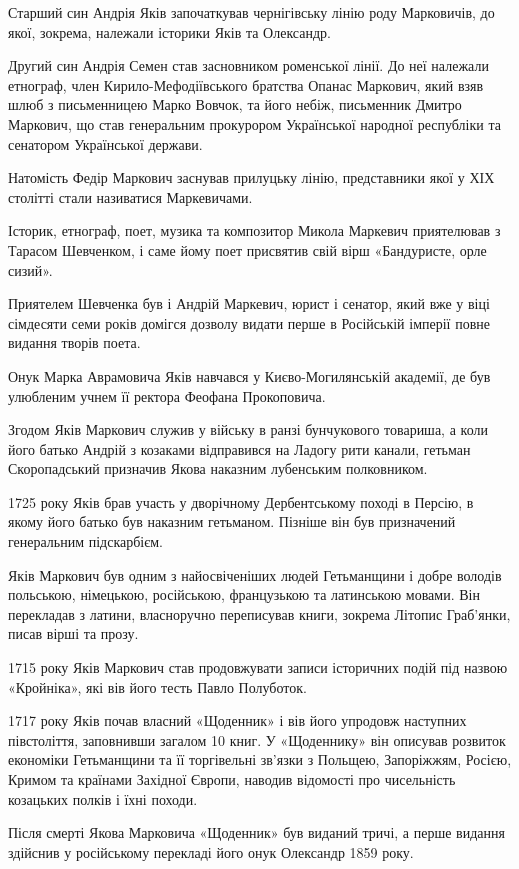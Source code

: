 Старший син Андрія Яків започаткував чернігівську лінію роду Марковичів, до
якої, зокрема, належали історики Яків та Олександр.

Другий син Андрія Семен став засновником роменської лінії. До неї належали
етнограф, член Кирило-Мефодіївського братства Опанас Маркович, який взяв шлюб з
письменницею Марко Вовчок, та його небіж, письменник Дмитро Маркович, що став
генеральним прокурором Української народної республіки та сенатором Української
держави.

Натомість Федір Маркович заснував прилуцьку лінію, представники якої у ХІХ
столітті стали називатися Маркевичами.

Історик, етнограф, поет, музика та композитор Микола Маркевич приятелював з
Тарасом Шевченком, і саме йому поет присвятив свій вірш «Бандуристе, орле
сизий».

Приятелем Шевченка був і Андрій Маркевич, юрист і сенатор, який вже у віці
сімдесяти семи років домігся дозволу видати перше в Російській імперії повне
видання творів поета.

Онук Марка Аврамовича Яків навчався у Києво-Могилянській академії, де був улюбленим учнем її ректора Феофана Прокоповича.

Згодом Яків Маркович служив у війську в ранзі бунчукового товариша, а коли його
батько Андрій з козаками відправився на Ладогу рити канали, гетьман
Скоропадський призначив Якова наказним лубенським полковником.

1725 року Яків брав участь у дворічному Дербентському поході в Персію, в якому
його батько був наказним гетьманом. Пізніше він був призначений генеральним
підскарбієм.

Яків Маркович був одним з найосвіченіших людей Гетьманщини і добре володів
польською, німецькою, російською, французькою та латинською мовами. Він
перекладав з латини, власноручно переписував книги, зокрема Літопис Граб’янки,
писав вірші та прозу.

1715 року Яків Маркович став продовжувати записи історичних подій під назвою «Кройніка», які вів його тесть Павло Полуботок.

1717 року Яків почав власний «Щоденник» і вів його упродовж наступних
півстоліття, заповнивши загалом 10 книг. У «Щоденнику» він описував розвиток
економіки Гетьманщини та її торгівельні зв’язки з Польщею, Запоріжжям, Росією,
Кримом та країнами Західної Європи, наводив відомості про чисельність козацьких
полків і їхні походи.

Після смерті Якова Марковича «Щоденник» був виданий тричі, а перше видання
здійснив у російському перекладі його онук Олександр 1859 року.

